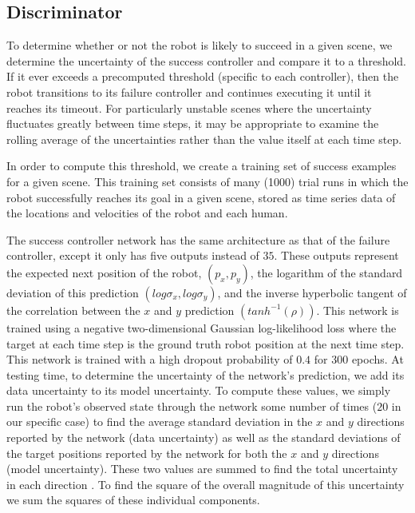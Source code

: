 \documentclass[letterpaper]{article}
\begin{document}
			\subsection{Discriminator}
				To determine whether or not the robot is likely to succeed in a given scene, we determine the uncertainty of the success controller and compare it to a threshold. If it ever exceeds a precomputed threshold (specific to each controller), then the robot transitions to its failure controller and continues executing it until it reaches its timeout. For particularly unstable scenes where the uncertainty fluctuates greatly between time steps, it may be appropriate to examine the rolling average of the uncertainties rather than the value itself at each time step. 
				
				In order to compute this threshold, we create a training set of success examples for a given scene. This training set consists of many (1000) trial runs in which the robot successfully reaches its goal in a given scene, stored as time series data of the locations and velocities of the robot and each human. 
				
				The success controller network has the same architecture as that of the failure controller, except it only has five outputs instead of $35$. These outputs represent the expected next position of the robot, $(p_x, p_y)$, the logarithm of the standard deviation of this prediction $(log\sigma_x, log\sigma_y)$, and the inverse hyperbolic tangent of the correlation between the $x$ and $y$ prediction $(tanh^{-1}(\rho))$. This network is trained using a negative two-dimensional Gaussian log-likelihood loss where the target at each time step is the ground truth robot position at the next time step. This network is trained with a high dropout probability of $0.4$ for $300$ epochs. At testing time, to determine the uncertainty of the network's prediction, we add its data uncertainty to its model uncertainty. To compute these values, we simply run the robot's observed state through the network some number of times ($20$ in our specific case) to find the average standard deviation in the $x$ and $y$ directions reported by the network (data uncertainty) as well as the standard deviations of the target positions reported by the network for both the $x$ and $y$ directions (model uncertainty). These two values are summed to find the total uncertainty in each direction \cite{uncertaintyindeeplearning}. To find the square of the overall magnitude of this uncertainty we sum the squares of these individual components.
				
\end{document}
